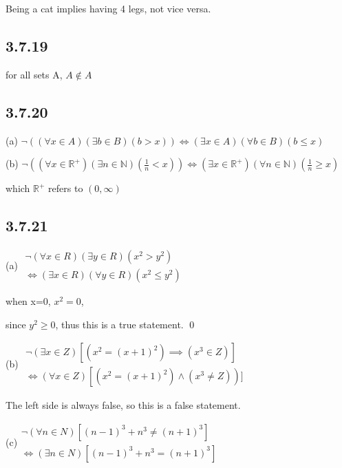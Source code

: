 \documentclass{article}
\begin{document}
Being a cat implies having 4 legs, not vice versa.

\subsection*{3.7.19}

for all sets A, $A\notin A$

\subsection*{3.7.20}

(a) $\neg ((\forall x\in A)(\exists b\in B)(b>x))\iff (\exists x\in A)(\forall b \in B)(b \leq x)$

(b) $\neg ((\forall x\in \mathbb{R}^+)(\exists n\in \mathbb{N})(\frac{1}{n}<x)) \iff (\exists x \in \mathbb{R}^+)(\forall n\in \mathbb{N})(\frac{1}{n}\geq x)$

which $\mathbb{R}^+$ refers to $(0,\infty)$

\subsection*{3.7.21}

(a) $\begin{matrix}\neg\left(\forall x\in R\right)\left(\exists y\in R\right)\left(x^{2}>y^{2}\right)\\ \iff\left(\exists x\in R\right)\left(\forall y\in R\right)\left(x^{2}\leq y^{2}\right)\end{matrix}$

when x=0, $x^2=0$,

since $y^2\geq 0$, thus this is a true statement. \qed


(b) $\begin{matrix}\neg\left(\exists x\in Z\right)\left[\left(x^{2}=\left(x+1\right)^{2}\right)\implies\left(x^{3}\in Z\right)\right]\\ \Leftrightarrow\left(\forall x\in Z\right)\left[\left(x^{2}=\left(x+1\right)^{2}\right)\land (x^3\neq Z)\right)]\end{matrix}$

The left side is always false, so this is a false statement.

(c)$\begin{matrix}\neg\left(\forall n\in N\right)\left[\left(n-1\right)^{3}+n^{3}\neq\left(n+1\right)^{3}\right]\\ \Leftrightarrow\left(\exists n\in N\right)\left[\left(n-1\right)^{3}+n^{3}=\left(n+1\right)^{3}\right]\end{matrix}$
\end{document}
